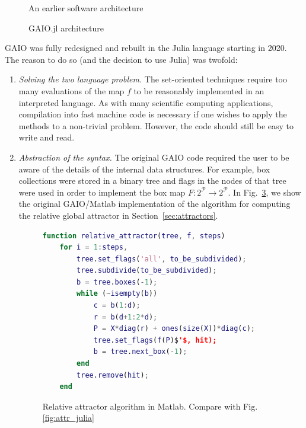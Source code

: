 \documentclass{juliacon}
\newcommand{\cP}{\mathcal{P}}
\begin{document}
\begin{figure}[h]
    \centering
    \resizebox{0.45\textwidth}{!}{
        
    }
    \caption{An earlier software architecture}
    \label{fig:old_arch}
\end{figure}

\begin{figure}[h]
    \centering
    
    \caption{GAIO.jl architecture}
    \label{fig:arch}
\end{figure}

GAIO was fully redesigned and rebuilt in the Julia language starting in 2020. The reason to do so (and the decision to use Julia) was twofold:

\begin{enumerate}
    \item \emph{Solving the two language problem.} The set-oriented techniques require too many evaluations of the map $f$ to be reasonably implemented in an interpreted language. As with many scientific computing applications, compilation into fast machine code is necessary if one wishes to apply the methods to a non-trivial problem. However, the code should still be easy to write and read. 
    
    \item \emph{Abstraction of the syntax.} The original GAIO code required the user to be aware of the details of the internal data structures. For example, box collections were stored in a binary tree and flags in the nodes of that tree were used in order to implement the box map $F:2^\cP\to 2 ^\cP$. In Fig.~\ref{fig:attr_matlab}, we show the original GAIO/Matlab implementation of the algorithm for computing the relative global attractor in Section~\ref{sec:attractors}.
\begin{figure}[h]
\begin{lstlisting}[language=Matlab,mathescape]
function relative_attractor(tree, f, steps)
    for i = 1:steps,
        tree.set_flags('all', to_be_subdivided); 
        tree.subdivide(to_be_subdivided);   
        b = tree.boxes(-1); 
        while (~isempty(b))
            c = b(1:d); 
            r = b(d+1:2*d);
            P = X*diag(r) + ones(size(X))*diag(c); 
            tree.set_flags(f(P)$'$, hit);          
            b = tree.next_box(-1);
        end
        tree.remove(hit);                         
    end
\end{lstlisting}
\caption{Relative attractor algorithm in Matlab. Compare with Fig. \ref{fig:attr_julia}}
\label{fig:attr_matlab}
\end{figure}


\end{enumerate}
\end{document}
